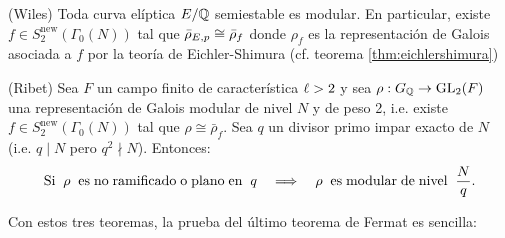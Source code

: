 \begin{thm}\label{thm:wiles}(Wiles)
	Toda curva elíptica $E/\mathbb{Q}$ semiestable es modular. En particular, existe $f\in S_2^{\mathrm{new}}(\Gamma_0(N))$ tal que $\bar{\rho}_{E,p}\cong\bar{\rho}_f$ donde $\rho_f$ es la representación de Galois asociada a $f$ por la teoría de Eichler-Shimura (cf. teorema \ref{thm:eichlershimura})
\end{thm}

\begin{thm}\label{thm:ribet}(Ribet)
	Sea $F$ un campo finito de característica $\ell>2$ y sea $\rho:G_{\mathbb{Q}}\rightarrow\mathrm{GL}_2(F)$ una representación de Galois modular de nivel $N$ y de peso 2, i.e. existe $f\in S_2^{\mathrm{new}}(\Gamma_0(N))$ tal que $\rho\cong\bar{\rho}_f$. Sea $q$ un divisor primo impar exacto de $N$ (i.e. $q\mid N$ pero $q^2\nmid N$). Entonces:
	\[
		\mathrm{Si}\;\; \rho \;\;\mathrm{es}\;\mathrm{no}\;\mathrm{ramificado}\;\mathrm{o}\;\mathrm{plano}\;\mathrm{en}\;\;q\quad\Longrightarrow\quad \rho  \;\;\mathrm{es}\;\mathrm{modular}\;\mathrm{de}\;\mathrm{nivel}\;\; \frac{N}{q}.
	\]
\end{thm}

Con estos tres teoremas, la prueba del último teorema de Fermat es sencilla:

